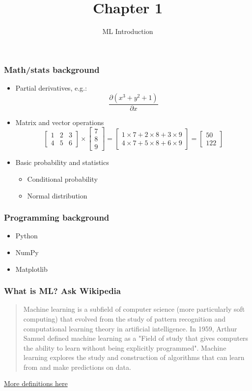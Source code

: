 \documentclass{beamer}
\title{Chapter 1}
\subtitle{ML Introduction}
\begin{document}
\maketitle

\begin{frame}
  \frametitle{Math/stats background}
  \begin{itemize}
  \item Partial derivatives, e.g.: \\
    \[
    \frac{\partial (x^3 + y^2 + 1)}{\partial x}
    \]
  \item Matrix and vector operations \\
    \[
    \begin{bmatrix}
      1 & 2  & 3\\
      4 & 5  & 6
    \end{bmatrix} \times  \begin{bmatrix}
      7 \\
      8 \\
      9
    \end{bmatrix} =  \begin{bmatrix}
      1 \times 7 + 2 \times 8 + 3 \times 9 \\
      4 \times 7 + 5 \times 8 + 6 \times 9
    \end{bmatrix} = \begin{bmatrix}
      50 \\
      122
    \end{bmatrix}
    \]
  \item Basic probability and statistics
    \begin{itemize}
    \item Conditional probability
    \item Normal distribution
    \end{itemize}
  \end{itemize}
\end{frame}

\begin{frame}
  \frametitle{Programming background}
  \begin{itemize}
  \item Python
  \item NumPy
  \item Matplotlib
  \end{itemize}
\end{frame}

\begin{frame}
  \frametitle{What is ML? Ask Wikipedia}
  \begin{quote}
    Machine learning is a subfield of computer science (more particularly soft computing) that evolved from the study of pattern recognition and computational learning theory in artificial intelligence. In 1959, Arthur Samuel defined machine learning as a "Field of study that gives computers the ability to learn without being explicitly programmed". Machine learning explores the study and construction of algorithms that can learn from and make predictions on data. 
  \end{quote}
  \href{http://machinelearningmastery.com/what-is-machine-learning/}{More definitions here}
\end{frame}
\end{document}
